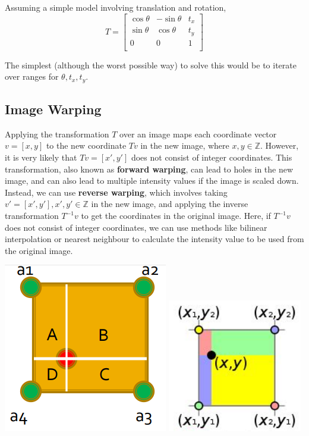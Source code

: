 \documentclass{report}
\begin{document}
Assuming a simple model involving translation and rotation,
$$
  T = \begin{bmatrix}
    \cos\theta & -\sin\theta & t_x \\
    \sin\theta & \cos\theta  & t_y \\
    0          & 0           & 1   \\
  \end{bmatrix}
$$

The simplest (although the worst possible way) to solve this would be to iterate over ranges for $\theta,t_x,t_y$.

\subsection{Image Warping}

Applying the transformation $T$ over an image maps each coordinate vector $v = [x,y]$ to the new coordinate $Tv$ in the new image, where $x,y \in \mathbb{Z}$. However, it is very likely that $Tv = [x',y']$ does not consist of integer coordinates.
This transformation, also known as \textbf{forward warping}, can lead to holes in the new image, and can also lead to multiple intensity values if the image is scaled down. \\

Instead, we can use \textbf{reverse warping}, which involves taking $v' = [x',y'], x',y' \in \mathbb{Z}$ in the new image, and applying the inverse transformation $T^{-1}v$ to get the coordinates in the original image. Here, if $T^{-1}v$ does not consist of integer coordinates, we can use methods like bilinear interpolation or nearest neighbour to calculate the intensity value to be used from the original image.

\begin{center}
  \includegraphics[scale=0.8]{"images/05.png"} \qquad
  \includegraphics[scale=1.1]{"images/06.png"}
\end{center}
\end{document}
